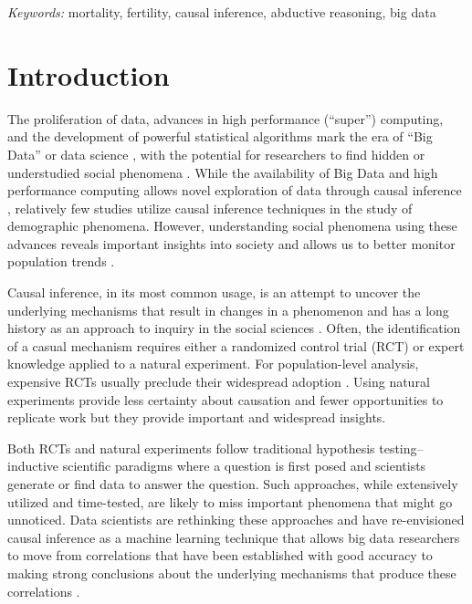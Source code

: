 \documentclass[12pt]{article}
\begin{document}
\noindent%
{\it Keywords:} mortality, fertility, causal inference, abductive reasoning, big data
\vfill

\newpage
{} %

\newpage

\hypertarget{introduction}{%
\section{Introduction}\label{introduction}}

The proliferation of data, advances in high performance (``super'')
computing, and the development of powerful statistical algorithms mark
the era of ``Big Data'' or data science
\citep{van2016data, zikopoulos2011}, with the potential for researchers
to find hidden or understudied social phenomena
\citep{bohon2018demography}. While the availability of Big Data and high
performance computing allows novel exploration of data through causal
inference
\citep{bohon2018demography, rcausalimpact, shiffrin2016drawing},
relatively few studies utilize causal inference techniques in the study
of demographic phenomena. However, understanding social phenomena using
these advances reveals important insights into society
\citep{angrist1989lifetime, mas2009peers} and allows us to better
monitor population trends \citep{nobles2019, torche2015hidden}.

Causal inference, in its most common usage, is an attempt to uncover the
underlying mechanisms that result in changes in a phenomenon and has a
long history as an approach to inquiry in the social sciences
\citep{grimmer2015ppsp}. Often, the identification of a casual mechanism
requires either a randomized control trial (RCT) or expert knowledge
applied to a natural experiment. For population-level analysis,
expensive RCTs usually preclude their widespread adoption
\citep{west2008ajph}. Using natural experiments provide less certainty
about causation and fewer opportunities to replicate work but they
provide important and widespread insights.

Both RCTs and natural experiments follow traditional hypothesis
testing--inductive scientific paradigms where a question is first posed
and scientists generate or find data to answer the question. Such
approaches, while extensively utilized and time-tested, are likely to
miss important phenomena that might go unnoticed. Data scientists are
rethinking these approaches and have re-envisioned causal inference as a
machine learning technique that allows big data researchers to move from
correlations that have been established with good accuracy to making
strong conclusions about the underlying mechanisms that produce these
correlations \citep{pearl2018book}.
\end{document}
